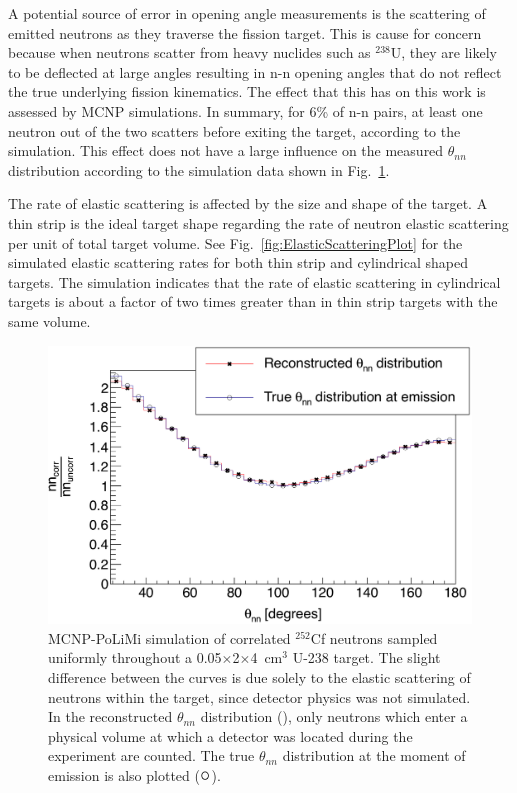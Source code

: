 \label{subsection:Elastic_scattering}
A potential source of error in opening angle measurements is the scattering of emitted neutrons as they traverse the fission target.
This is cause for concern because when neutrons scatter from heavy nuclides such as $^{238}$U, they are likely to be deflected at large angles resulting in n-n opening angles that do not reflect the true underlying fission kinematics.
The effect that this has on this work is assessed by MCNP simulations.
In summary, for 6\% of n-n pairs, at least one neutron out of the two scatters before exiting the target, according to the simulation.
This effect does not have a large influence on the measured $\theta_{nn}$ distribution according to the simulation data shown in Fig.~\ref{fig:ElasticScatteringEffect}.

The rate of elastic scattering is affected by the size and shape of the target.
A thin strip is the ideal target shape regarding the rate of neutron elastic scattering per unit of total target volume.
See Fig.~\ref{fig:ElasticScatteringPlot} for the simulated elastic scattering rates for both thin strip and cylindrical shaped targets.
The simulation indicates that the rate of elastic scattering in cylindrical targets is about a factor of two times greater than in thin strip targets with the same volume.
\begin{figure}
    \centering
    \includegraphics[width = \figsize\textwidth]{EffectOfElasticScattering.png}
    \caption{
    MCNP-PoLiMi simulation of correlated $^{252}$Cf neutrons sampled uniformly throughout a 0.05$\times$2$\times$4~cm$^3$ U-238 target.
    The slight difference between the curves is due solely to the elastic scattering of neutrons within the target, since detector physics was not simulated.
    In the reconstructed $\theta_{nn}$ distribution ({\tiny {}}), only neutrons which enter a physical volume at which a detector was located during the experiment are counted.
   The true $\theta_{nn}$ distribution at the moment of emission is also plotted ($\mathlarger{\mathlarger{\mathlarger{\circ}}}$).
    }
    \label{fig:ElasticScatteringEffect}
\end{figure}
